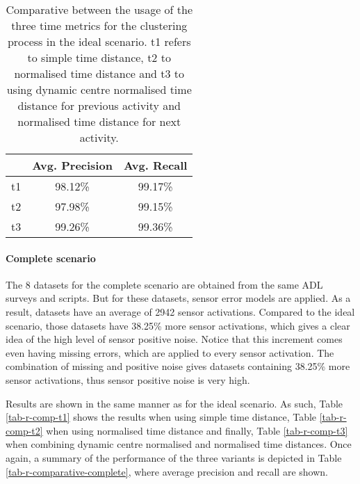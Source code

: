 \begin{table}[htbp]\scriptsize
\begin{center}
 \begin{tabular}{ccc}
  \hline
   & Avg. Precision & Avg. Recall \\
  \hline
  t1 & 98.12\% & 99.17\% \\
  t2 & 97.98\% & 99.15\% \\
  t3 & 99.26\% & 99.36\% \\
  \hline
 \end{tabular}
 \caption{Comparative between the usage of the three time metrics for the clustering process in the ideal scenario. t1 refers to simple time distance, t2 to normalised time distance and t3 to using dynamic centre normalised time distance for previous activity and normalised time distance for next activity.}
 \label{tab-r-comparative-ideal}
\end{center} 
\end{table}

\paragraph*{Complete scenario}

The 8 datasets for the complete scenario are obtained from the same ADL surveys and scripts. But for these datasets, sensor error models are applied. As a result, datasets have an average of 2942 sensor activations. Compared to the ideal scenario, those datasets have 38.25\% more sensor activations, which gives a clear idea of the high level of sensor positive noise. Notice that this increment comes even having missing errors, which are applied to every sensor activation. The combination of missing and positive noise gives datasets containing 38.25\% more sensor activations, thus sensor positive noise is very high. 

Results are shown in the same manner as for the ideal scenario. As such, Table \ref{tab-r-comp-t1} shows the results when using simple time distance, Table \ref{tab-r-comp-t2} when using normalised time distance and finally, Table \ref{tab-r-comp-t3} when combining dynamic centre normalised and normalised time distances. Once again, a summary of the performance of the three variants is depicted in Table \ref{tab-r-comparative-complete}, where average precision and recall are shown.
       
